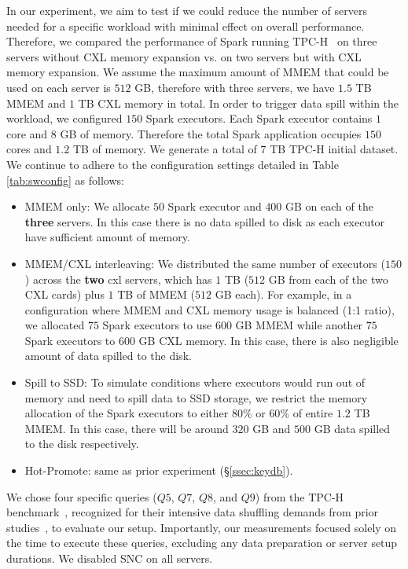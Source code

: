 In our experiment, we aim to test if we could reduce the number of servers needed for a specific workload with minimal effect on overall performance. Therefore, we compared the performance of Spark running TPC-H~\cite{tpch} on three servers without CXL memory expansion vs. on two servers but with CXL memory expansion. We assume the maximum amount of MMEM that could be used on each server is $512$ GB, therefore with three servers, we have $1.5$ TB MMEM and $1$ TB CXL memory in total.
In order to trigger data spill within the workload, we configured $150$ Spark executors. Each Spark executor contains $1$ core and $8$ GB of memory. Therefore the total Spark application occupies $150$ cores and $1.2$ TB of memory. We generate a total of $7$ TB TPC-H initial dataset. We continue to adhere to the configuration settings detailed in Table \ref{tab:swconfig} as follows:
\begin{itemize}
  \item MMEM only: We allocate $50$ Spark executor and $400$ GB on each of the \textbf{three} servers. In this case there is no data spilled to disk as each executor have sufficient amount of memory.
  \item MMEM/CXL interleaving: We distributed the same number of executors ($150$) across the \textbf{two} cxl servers, which has $1$ TB ($512$ GB from each of the two CXL cards) plus $1$ TB of MMEM ($512$ GB each). For example, in a configuration where MMEM and CXL memory usage is balanced (1:1 ratio), we allocated $75$ Spark executors to use $600$ GB MMEM while another $75$ Spark executors to $600$ GB CXL memory. In this case, there is also negligible amount of data spilled to the disk.
  \item Spill to SSD: To simulate conditions where executors would run out of memory and need to spill data to SSD storage, we restrict the memory allocation of the Spark executors to either $80\%$ or $60\%$ of entire $1.2$ TB MMEM. In this case, there will be around $320$ GB and $500$ GB data spilled to the disk respectively.
  \item Hot-Promote: same as prior experiment (\S\ref{ssec:keydb}).
\end{itemize}
We chose four specific queries ($Q5$, $Q7$, $Q8$, and $Q9$) from the TPC-H benchmark~\cite{tpch}, recognized for their intensive data shuffling demands from prior studies~\cite{PSACS}, to evaluate our setup. Importantly, our measurements focused solely on the time to execute these queries, excluding any data preparation or server setup durations. We disabled SNC on all servers.

